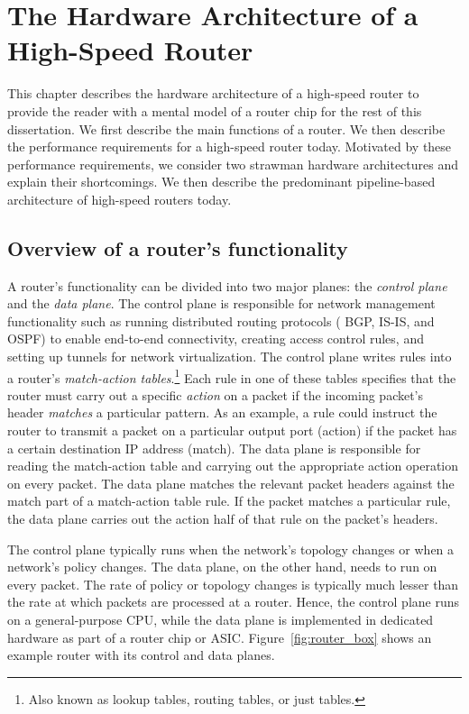 \chapter{The Hardware Architecture of a High-Speed Router}
\label{chap:arch}
This chapter describes the hardware architecture of a high-speed router to
provide the reader with a mental model of a router chip for the rest of this
dissertation. We first describe the main functions of a router. We then
describe the performance requirements for a high-speed router today. Motivated
by these performance requirements, we consider two strawman hardware
architectures and explain their shortcomings. We then describe the predominant
pipeline-based architecture of high-speed routers today.

\section{Overview of a router's functionality}

A router's functionality can be divided into two major planes: the {\em control
plane} and the {\em data plane}. The control plane is responsible for network
management functionality such as running distributed routing protocols (\eg
BGP, IS-IS, and OSPF) to enable end-to-end connectivity, creating access
control rules, and setting up tunnels for network virtualization. The control
plane writes rules into a router's {\em match-action tables}.\footnote{Also
known as lookup tables, routing tables, or just tables.} Each rule in one of
these tables specifies that the router must carry out a specific {\em action}
on a packet if the incoming packet's header {\em matches} a particular pattern.
As an example, a rule could instruct the router to transmit a packet on a
particular output port (action) if the packet has a certain destination IP address
(match). The data plane is responsible for reading the match-action table and
carrying out the appropriate action operation on every packet.  The data plane
matches the relevant packet headers against the match part of a match-action
table rule. If the packet matches a particular rule, the data plane carries out
the action half of that rule on the packet's headers.

The control plane typically runs when the network's topology changes or when a
network's policy changes. The data plane, on the other hand, needs to run on
every packet. The rate of policy or topology changes is typically much lesser
than the rate at which packets are processed at a router. Hence, the control
plane runs on a general-purpose CPU, while the data plane is implemented in
dedicated hardware as part of a router chip or ASIC.
Figure~\ref{fig:router_box} shows an example router with its control and data
planes.

